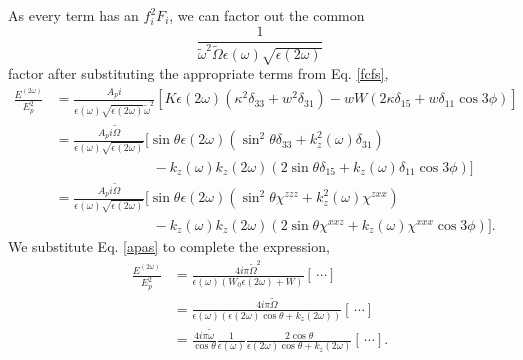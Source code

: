 As every term has an $f^{2}_{i}F_{i}$, we can factor out the common
\begin{equation*}
\frac{1}
{\tilde{\omega}^2\tilde{\Omega}\epsilon(\omega)\sqrt{\epsilon(2\omega)}}
\end{equation*}
factor after substituting the appropriate terms from Eq. \eqref{fcfs},
\begin{equation*}
\begin{split}
\frac{E^{(2\omega)}}{E^{2}_{p}}
&= \frac{A_{p}i}{\epsilon(\omega)\sqrt{\epsilon(2\omega)}\tilde{\omega}^2}
   \left[
   K\epsilon(2\omega)(\kappa^{2}\delta_{33} + w^{2}\delta_{31})
   - wW(2\kappa\delta_{15} + w\delta_{11}\cos3\phi)
   \right]\\
&= \frac{A_{p}i\tilde{\Omega}}{\epsilon(\omega)\sqrt{\epsilon(2\omega)}}
   \big[
   \sin\theta\epsilon(2\omega)(
   \sin^{2}\theta\delta_{33} + k^{2}_{z}(\omega)\delta_{31})\\
   &\qquad\qquad\qquad\quad- k_{z}(\omega)k_{z}(2\omega)(2\sin\theta\delta_{15}
   + k_{z}(\omega)\delta_{11}\cos3\phi)
   \big]\\
&= \frac{A_{p}i\tilde{\Omega}}{\epsilon(\omega)\sqrt{\epsilon(2\omega)}}
   \big[
   \sin\theta\epsilon(2\omega)(
   \sin^{2}\theta\chi^{zzz} + k^{2}_{z}(\omega)\chi^{zxx})\\
   &\qquad\qquad\qquad\quad- k_{z}(\omega)k_{z}(2\omega)(2\sin\theta\chi^{xxz}
   + k_{z}(\omega)\chi^{xxx}\cos3\phi)
   \big].
\end{split}
\end{equation*}
We substitute Eq. \eqref{apas} to complete the expression,
\begin{equation*}
\begin{split}
\frac{E^{(2\omega)}}{E^{2}_{p}}
&= \frac{4i\pi\tilde{\Omega}^{2}}{\epsilon(\omega)(W_{0}\epsilon(2\omega) + W)}
   [\,\cdots]\\
&= \frac{4i\pi\tilde{\Omega}}
   {\epsilon(\omega)(\epsilon(2\omega)\cos\theta + k_{z}(2\omega))}
   [\,\cdots]\\
&= \frac{4i\pi\tilde{\omega}}{\cos\theta}
   \frac{1}{\epsilon(\omega)}
   \frac{2\cos\theta}{\epsilon(2\omega)\cos\theta + k_{z}(2\omega)}[\,\cdots].
\end{split}
\end{equation*}

